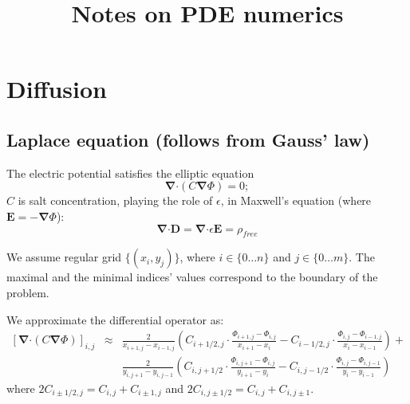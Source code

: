 \documentclass[11pt]{article}
\title{Notes on PDE numerics}
\newcommand\eps \epsilon
\newcommand{\vect}[1]{\ensuremath{\mathbf{#1}}}
\providecommand\bnabla{\boldsymbol{\nabla}}
\providecommand\bcdot{\boldsymbol{\cdot}}
\begin{document}
\maketitle
\section{Diffusion}
\subsection{Laplace equation (follows from Gauss' law)}
The electric potential satisfies the elliptic equation
\begin{equation}
	\bnabla \bcdot (C \bnabla \varPhi) = 0; \label{Phi eqn}
\end{equation}
$C$ is salt concentration, playing the role of $\eps$,
in Maxwell's equation (where $\vect{E} = -\bnabla \varPhi$):
\begin{equation}
\bnabla \bcdot \vect{D} = \bnabla \bcdot \eps \vect{E} = \rho_{free}
\end{equation}

We assume regular grid $\{(x_i, y_j)\}$,
where $i\in\{0 \ldots n\}$ and $j\in\{0 \ldots m\}$. The maximal and the
minimal indices' values correspond to the boundary of the problem.

We approximate the differential operator as:
\begin{eqnarray}
\left[ \bnabla \bcdot (C \bnabla \varPhi) \right]_{i,j}
&\approx &\frac{2}{x_{i+1,j} - x_{i-1,j}} \left(
C_{i+1/2,j} \cdot \frac{\varPhi_{i+1,j}-\varPhi_{i,j}}{x_{i+1}-x_{i}} -
C_{i-1/2,j} \cdot \frac{\varPhi_{i,j}-\varPhi_{i-1,j}}{x_{i}-x_{i-1}}
\right) + \\
&&\frac{2}{y_{i,j+1} - y_{i,j-1}} \left(C_{i,j+1/2} \cdot \frac{\varPhi_{i,j+1}-\varPhi_{i,j}}{y_{i+1}-y_{i}} -
C_{i,j-1/2} \cdot \frac{\varPhi_{i,j}-\varPhi_{i,j-1}}{y_{i}-y_{i-1}}
\right)
\end{eqnarray}
where $2C_{i\pm 1/2,j} = C_{i,j} + C_{i\pm 1,j}$ and
$2C_{i,j\pm 1/2} = C_{i,j} + C_{i,j\pm 1}$.
\end{document}
